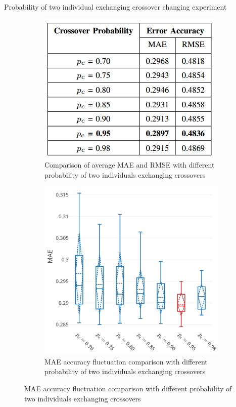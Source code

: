 \documentclass{beamer}
\newcommand{\notesize}{\fontsize{8}{10}\selectfont}
\begin{document}
\begin{frame}{Probability of two individual exchanging crossover changing experiment}
	\begin{figure}
		\centering
		\begin{subfigure}{0.4\textwidth}
			\centering
			\includegraphics[width=1.0\linewidth]{pc_changing.png}
			\caption*{\notesize Comparison of average MAE and RMSE with different probability of two individuals exchanging crossovers}
			\label{fig:sub11}
		\end{subfigure}%
		\begin{subfigure}{.6\textwidth}
			\centering
			\includegraphics[width=0.8\linewidth]{tn2_multi_cpu_best_pc.pdf}
			\caption*{ \notesize MAE accuracy fluctuation comparison with different probability of two individuals exchanging crossovers}
			\label{fig:sub21}
		\end{subfigure}%
		\label{fig:cpu_predict}
	\end{figure}
\end{frame}
\end{document}
